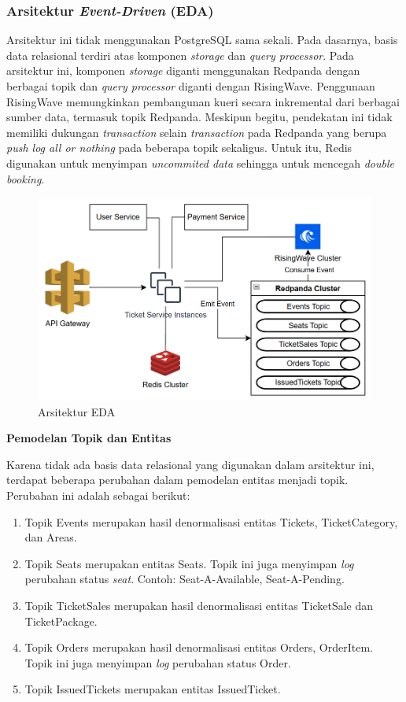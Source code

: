 \subsubsection{Arsitektur \textit{Event-Driven} (EDA)}

Arsitektur ini tidak menggunakan PostgreSQL sama sekali. Pada dasarnya, basis data relasional terdiri atas komponen \textit{storage} dan \textit{query processor}. Pada arsitektur ini, komponen \textit{storage} diganti menggunakan Redpanda dengan berbagai topik dan \textit{query processor} diganti dengan RisingWave. Penggunaan RisingWave memungkinkan pembangunan kueri secara inkremental dari berbagai sumber data, termasuk topik Redpanda. Meskipun begitu, pendekatan ini tidak memiliki dukungan \textit{transaction} selain \textit{transaction} pada Redpanda yang berupa \textit{push log all or nothing} pada beberapa topik sekaligus. Untuk itu, Redis digunakan untuk menyimpan \textit{uncommited data} sehingga untuk mencegah \textit{double booking}.

\begin{figure}[htbp]
    \centering
    \includegraphics[width=1\textwidth]{resources/appendix/architecture-event-driven.png}
    \caption{Arsitektur EDA}
    \label{fig:solution-event-driven-architecture}
\end{figure}

\textbf{Pemodelan Topik dan Entitas}

Karena tidak ada basis data relasional yang digunakan dalam arsitektur ini, terdapat beberapa perubahan dalam pemodelan entitas menjadi topik. Perubahan ini adalah sebagai berikut:

\begin{enumerate}
    \item Topik Events merupakan hasil denormalisasi entitas Tickets, TicketCategory, dan Areas.
    \item Topik Seats merupakan entitas Seats. Topik ini juga menyimpan \textit{log} perubahan status \textit{seat}. Contoh: Seat-A-Available, Seat-A-Pending.
    \item Topik TicketSales merupakan hasil denormalisasi entitas TicketSale dan TicketPackage.
    \item Topik Orders merupakan hasil denormalisasi entitas Orders, OrderItem. Topik ini juga menyimpan \textit{log} perubahan status Order.
    \item Topik IssuedTickets merupakan entitas IssuedTicket.
\end{enumerate}

